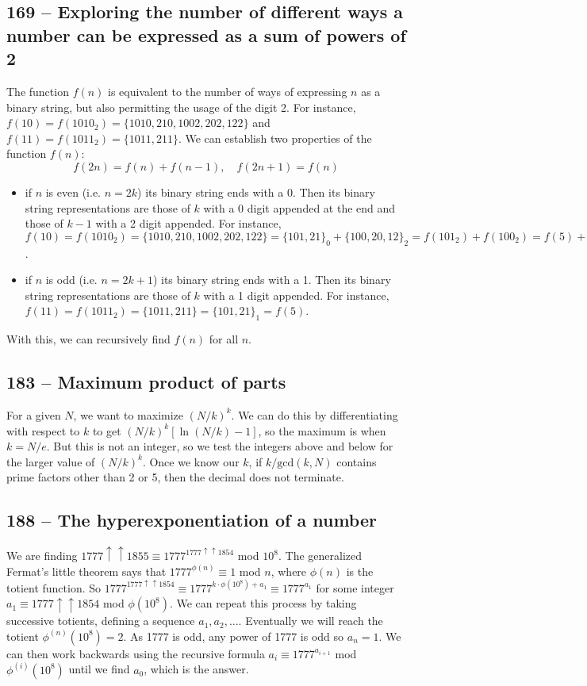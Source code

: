 \documentclass{article}
\begin{document}
\subsection*{169 -- Exploring the number of different ways a number can be expressed as a sum of powers of 2} 
The function $f(n)$ is equivalent to the number of ways of expressing $n$ as a binary string, but also permitting the usage of the digit 2. 
For instance, $f(10) = f(1010_2) = \{1010, 210, 1002, 202, 122\}$ and $f(11) = f(1011_2) = \{1011, 211\}$. 
We can establish two properties of the function $f(n)$:
 \[ f(2n) = f(n) + f(n-1), \quad f(2n+1) = f(n) \]
\begin{itemize}
\item if $n$ is even (i.e. $n = 2k$) its binary string ends with a 0. Then its binary string representations are those of $k$ with a 0 digit appended at the end and those of $k-1$ with a 2 digit appended. For instance, $f(10) = f(1010_2) = \{1010, 210, 1002, 202, 122\} = \{101, 21\}_0 + \{100, 20, 12\}_2 = f(101_2) + f(100_2) = f(5) + f(4)$.
\item if $n$ is odd (i.e. $n = 2k+1$) its binary string ends with a 1. Then its binary string representations are those of $k$ with a 1 digit appended. For instance, $f(11) = f(1011_2) = \{1011, 211\} = \{101, 21\}_1 = f(5)$.
\end{itemize}
With this, we can recursively find $f(n)$ for all $n$.

\subsection*{183 -- Maximum product of parts} 
For a given $N$, we want to maximize $(N/k)^k$. 
We can do this by differentiating with respect to $k$ to get $(N/k)^k[\ln(N/k) - 1]$, so the maximum is when $k = N/e$. 
But this is not an integer, so we test the integers above and below for the larger value of $(N/k)^k$. 
Once we know our $k$, if $k/\text{gcd}(k, N)$ contains prime factors other than 2 or 5, then the decimal does not terminate.

\subsection*{188 -- The hyperexponentiation of a number} 
We are finding $1777\uparrow\uparrow1855 \equiv 1777^{1777\uparrow\uparrow1854}$ mod $10^8$. 
The generalized Fermat's little theorem says that $1777^{\phi(n)} \equiv 1$ mod $n$, where $\phi(n)$ is the totient function. 
So $1777^{1777\uparrow\uparrow1854} \equiv 1777^{k\cdot\phi(10^8) + a_1} \equiv 1777^{a_1}$ for some integer $a_1 \equiv 1777\uparrow\uparrow1854$ mod $\phi(10^8)$. 
We can repeat this process by taking successive totients, defining a sequence $a_1, a_2, \dotsc$. 
Eventually we will reach the totient $\phi^{(n)}(10^8) = 2$. 
As 1777 is odd, any power of 1777 is odd so $a_n = 1$. 
We can then work backwards using the recursive formula $a_{i} \equiv 1777^{a_{i+1}}$ mod $\phi^{(i)}(10^8)$ until we find $a_0$, which is the answer.
\end{document}
